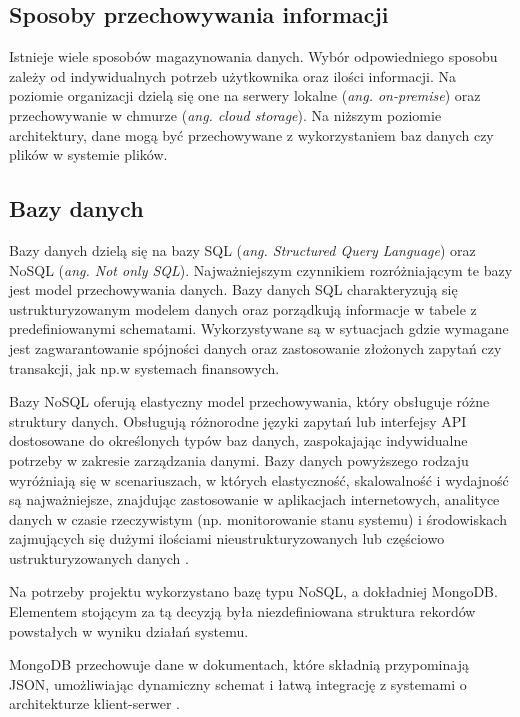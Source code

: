 \documentclass[12pt,a4paper,twoside]{article}
\begin{document}
\subsection{Sposoby przechowywania informacji}
Istnieje wiele sposobów magazynowania danych. Wybór odpowiedniego sposobu zależy od indywidualnych potrzeb użytkownika oraz ilości informacji. 
Na poziomie organizacji dzielą się one na serwery lokalne (\textit{ang. on-premise}) oraz przechowywanie w chmurze (\textit{ang. cloud storage}). Na niższym poziomie architektury, dane mogą być przechowywane z wykorzystaniem baz danych czy plików w systemie plików.\par
\subsection*{Bazy danych}
Bazy danych dzielą się na bazy SQL (\textit{ang. Structured Query Language}) oraz NoSQL (\textit{ang. Not only SQL}). Najważniejszym czynnikiem rozróżniającym te bazy jest model przechowywania danych. Bazy danych SQL charakteryzują się ustrukturyzowanym modelem danych oraz porządkują informacje w tabele z predefiniowanymi schematami. Wykorzystywane są w sytuacjach gdzie wymagane jest zagwarantowanie spójności danych oraz zastosowanie złożonych zapytań czy transakcji, jak np.\break w systemach finansowych.\par
Bazy NoSQL oferują elastyczny model przechowywania, który obsługuje różne struktury danych. Obsługują różnorodne języki zapytań lub interfejsy API dostosowane do określonych typów baz danych, zaspokajając indywidualne potrzeby w zakresie zarządzania danymi. Bazy danych powyższego rodzaju wyróżniają się w scenariuszach, w których elastyczność, skalowalność i wydajność są najważniejsze, znajdując zastosowanie w aplikacjach internetowych, analityce danych w czasie rzeczywistym (np. monitorowanie stanu systemu) i środowiskach zajmujących się dużymi ilościami nieustrukturyzowanych lub częściowo ustrukturyzowanych danych \cite{novssql}.\par
Na potrzeby projektu wykorzystano bazę typu NoSQL, a dokładniej MongoDB. Elementem stojącym za tą decyzją była niezdefiniowana struktura rekordów powstałych w wyniku działań systemu. \par
MongoDB przechowuje dane w dokumentach, które składnią przypominają JSON, umożliwiając dynamiczny schemat i łatwą integrację z systemami o architekturze klient-serwer \cite{mongodb}. 
\end{document}
